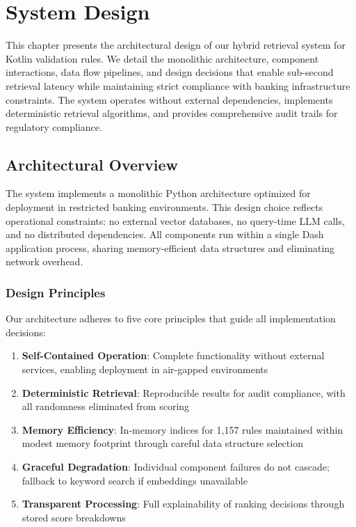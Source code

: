 \chapter{System Design}
\label{ch:system-design}

This chapter presents the architectural design of our hybrid retrieval system for Kotlin validation rules. We detail the monolithic architecture, component interactions, data flow pipelines, and design decisions that enable sub-second retrieval latency while maintaining strict compliance with banking infrastructure constraints. The system operates without external dependencies, implements deterministic retrieval algorithms, and provides comprehensive audit trails for regulatory compliance.

\section{Architectural Overview}

The system implements a monolithic Python architecture optimized for deployment in restricted banking environments. This design choice reflects operational constraints: no external vector databases, no query-time LLM calls, and no distributed dependencies. All components run within a single Dash application process, sharing memory-efficient data structures and eliminating network overhead.

\subsection{Design Principles}

Our architecture adheres to five core principles that guide all implementation decisions:

\begin{enumerate}[leftmargin=*,itemsep=2pt,topsep=2pt]
  \item \textbf{Self-Contained Operation}: Complete functionality without external services, enabling deployment in air-gapped environments
  \item \textbf{Deterministic Retrieval}: Reproducible results for audit compliance, with all randomness eliminated from scoring
  \item \textbf{Memory Efficiency}: In-memory indices for 1,157 rules maintained within modest memory footprint through careful data structure selection
  \item \textbf{Graceful Degradation}: Individual component failures do not cascade; fallback to keyword search if embeddings unavailable
  \item \textbf{Transparent Processing}: Full explainability of ranking decisions through stored score breakdowns
\end{enumerate}

